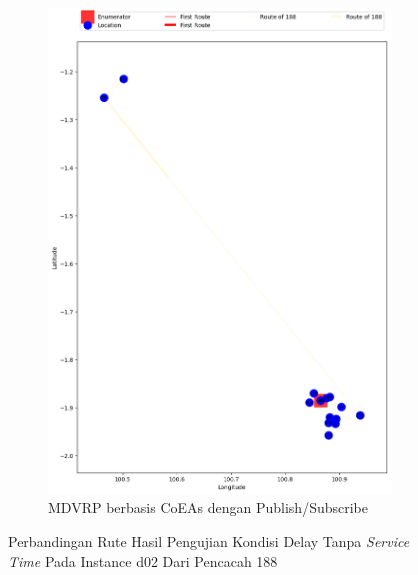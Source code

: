 \begin{figure}[H]\ContinuedFloat
	\centering
	\begin{subfigure}[t]{\textwidth}
		\centering
		\includegraphics[width=\textwidth]{Resources/Images/delayed_2/real_m15_n100_delayed_2_188_pubsub_coes}
		\caption{MDVRP berbasis CoEAs dengan Publish/Subscribe}
		\label{fig:real_m15_n100_delayed_2_188_pubsub_coes}
	\end{subfigure}
	\caption{Perbandingan Rute Hasil Pengujian Kondisi Delay Tanpa \textit{Service Time} Pada Instance d02 Dari Pencacah 188}
	\label{fig:real_m15_n100_delayed_2_188_contd}
\end{figure}


